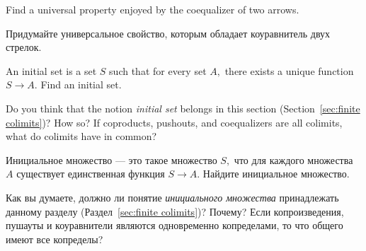 \documentclass[../main/CT4S-EN-RU]{subfiles}
\begin{document}
\begin{exerciseENG}
Find a universal property enjoyed by the coequalizer of two arrows.
\end{exerciseENG}

\begin{exerciseRUS}
Придумайте универсальное свойство, которым обладает коуравнитель двух стрелок.
\end{exerciseRUS}

\begin{exerciseENG}\label{exc:initial set}
An initial set is a set $S$ such that for every set $A,$ there exists a unique function $S{→} A.$ 
\sexc Find an initial set. 
\item Do you think that the notion {\em initial set} belongs in this section (Section~\ref{sec:finite colimits})? How so? If coproducts, pushouts, and coequalizers are all colimits, what do colimits have in common?
\endsexc
\end{exerciseENG}

\begin{exerciseRUS}\label{exc:initial set}
Инициальное множество — это такое множество $S,$ что для каждого множества $A$ существует единственная функция $S{→} A.$ 
\sexc Найдите инициальное множество. 
\item Как вы думаете, должно ли понятие {\em инициального множества} принадлежать данному разделу (Раздел~\ref{sec:finite colimits})? Почему? Если копроизведения, пушауты и коуравнители являются одновременно копределами, то что общего имеют все копределы?
\endsexc
\end{exerciseRUS}
\end{document}
